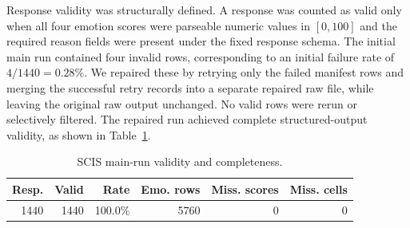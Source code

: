 \documentclass[conference]{IEEEtran}
\begin{document}
Response validity was structurally defined.
A response was counted as valid only when all four emotion scores were parseable numeric values in $[0,100]$ and the required reason fields were present under the fixed response schema.
The initial main run contained four invalid rows, corresponding to an initial failure rate of $4/1440=0.28\%$.
We repaired these by retrying only the failed manifest rows and merging the successful retry records into a separate repaired raw file, while leaving the original raw output unchanged.
No valid rows were rerun or selectively filtered.
The repaired run achieved complete structured-output validity, as shown in Table~\ref{tab:scis-validity}.
\begin{table}[t]
\centering
\caption{SCIS main-run validity and completeness.}
\label{tab:scis-validity}
\begin{tabular}{rrrrrr}
\hline
Resp. & Valid & Rate & Emo. rows & Miss. scores & Miss. cells \\
\hline
1440 & 1440 & 100.0\% & 5760 & 0 & 0 \\
\hline
\end{tabular}
\end{table}
\end{document}
